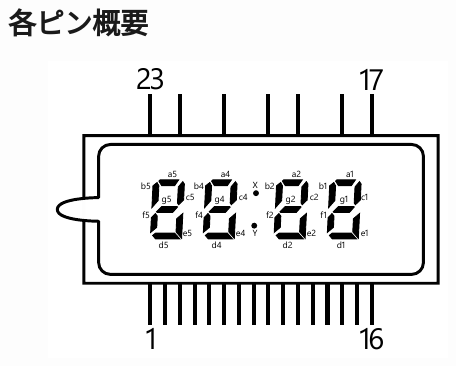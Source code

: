 \documentclass[12pt]{jarticle}
\begin{document}
\clearpage

\section{各ピン概要}

\begin{figure}[h]
    \begin{minipage}{0.65\linewidth}
        \centering
        \includegraphics[width=\linewidth]{../img/IVL275_mark_EN.pdf}
    \end{minipage}
    \hfill
    \begin{minipage}{0.2\linewidth}
        \centering

\end{minipage}
\end{figure}
\end{document}
